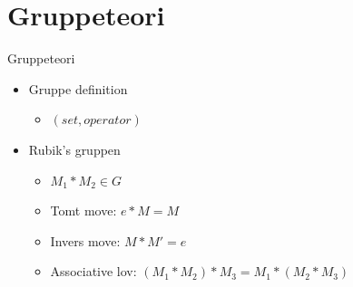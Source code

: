 \section{Gruppeteori}
\begin{frame}{Gruppeteori}
\begin{itemize}
	\item<1-> Gruppe definition 
	\begin{itemize}
		\item<1->  $(set,operator)$ 
	\end{itemize}
	\item<1-> Rubik's gruppen
	\begin{itemize}
		\item<1-> $M_1 * M_2 \in G$ 
		\item Tomt move: $e*M=M$
		\item Invers move: $M * M' = e$
		\item Associative lov: $(M_1 * M_2) * M_3 = M_1 * (M_2 * M_3)$
	\end{itemize}
\end{itemize}
\end{frame}

